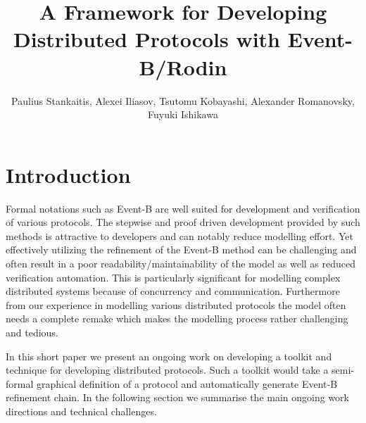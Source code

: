 \documentclass{llncs}
\begin{document}
	
	\title{A Framework for Developing Distributed Protocols with Event-B/Rodin}
	
	\author{Paulius Stankaitis, Alexei Iliasov, Tsutomu Kobayashi, Alexander Romanovsky, Fuyuki Ishikawa}
	
	\maketitle
	
	\setcounter{footnote}{0}
	
	\section{Introduction}
	
	Formal notations such as Event-B \cite{EventBBook} are well suited for development and verification of various protocols. The stepwise and proof driven development provided by such methods is attractive to developers and can notably reduce modelling effort. Yet effectively utilizing the refinement of the Event-B method can be challenging and often result in a poor readability/maintainability of the model as well as reduced verification automation. This is particularly significant for modelling complex distributed systems because of concurrency and communication. Furthermore from our experience in modelling various distributed protocols the model often needs a complete remake which makes the modelling process rather challenging and tedious.
	
	
	
	In this short paper we present an ongoing work on developing a toolkit and technique for developing distributed protocols. Such a toolkit would take a semi-formal graphical definition of a protocol and automatically generate Event-B refinement chain. In the following section we summarise the main ongoing work directions and technical challenges.
	
	
	
	
	
\end{document}
